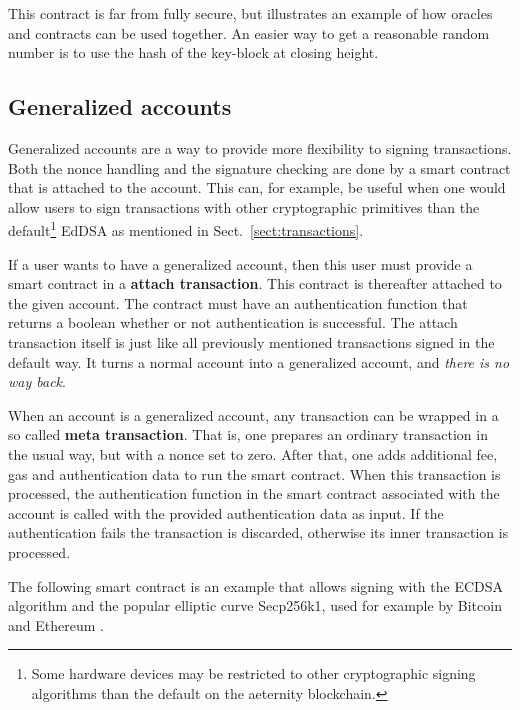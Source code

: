 This contract is far from fully secure, but illustrates an example of
how oracles and contracts can be used together. An easier way to
get a reasonable random number is to use the hash of the key-block at
closing height.




\subsection{Generalized accounts}
\label{sect:ga}

Generalized accounts are a way to provide more flexibility to signing
transactions. Both the nonce handling and the signature checking are
done by a smart contract that is attached to the account. This can,
for example, be useful when one would allow users to sign transactions with
other cryptographic primitives than the default\footnote{Some hardware
  devices may be restricted to other cryptographic signing algorithms
  than the default on the aeternity blockchain.} EdDSA as mentioned in
Sect.\ \ref{sect:transactions}.

If a user wants to have a generalized account, then this user must
provide a smart contract in a \textbf{attach transaction}. This
contract is thereafter attached to the given account. The contract
must have an authentication function that returns a boolean whether or
not authentication is successful. The attach transaction itself is
just like all previously mentioned transactions signed in the default
way. It turns a normal account into a generalized account, and
\textit{there is no way back}.

When an account is a generalized account, any transaction can
be wrapped in a so called \textbf{meta transaction}. That is, one
prepares an ordinary transaction in the usual way, but with a nonce set to
zero. After that, one adds additional fee, gas and authentication data to
run the smart contract. When this transaction is processed, the
authentication function in the smart contract associated with the
account is called with the provided authentication data as input. If
the authentication fails the transaction is discarded, otherwise its
inner transaction is processed.

The following smart contract is an example that allows signing with
the ECDSA algorithm \cite{johnson2001elliptic} and the popular elliptic curve
Secp256k1, used for example by Bitcoin and Ethereum
\cite{bos2014elliptic, mayer2016ecdsa}.

